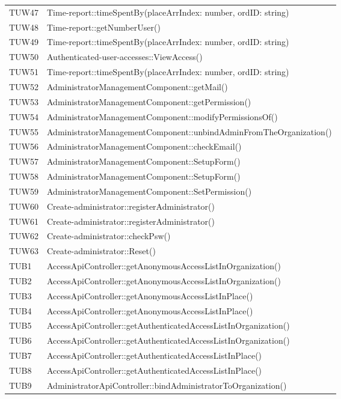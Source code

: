 {\begin{longtable}{C{2cm} C{8cm}}
		TUW47 & Time-report::timeSpentBy(placeArrIndex: number, ordID: string) \\
		TUW48 & Time-report::getNumberUser() \\
		TUW49 & Time-report::timeSpentBy(placeArrIndex: number, ordID: string) \\
		TUW50 & Authenticated-user-accesses::ViewAccess() \\
		TUW51 & Time-report::timeSpentBy(placeArrIndex: number, ordID: string) \\
		TUW52 & AdministratorManagementComponent::getMail() \\
		TUW53 & AdministratorManagementComponent::getPermission() \\
		TUW54 & AdministratorManagementComponent::modifyPermissionsOf() \\
		TUW55 & AdministratorManagementComponent::unbindAdminFromTheOrganization() \\
		TUW56 & AdministratorManagementComponent::checkEmail() \\
		TUW57 & AdministratorManagementComponent::SetupForm() \\
		TUW58 & AdministratorManagementComponent::SetupForm() \\
		TUW59 & AdministratorManagementComponent::SetPermission() \\
		TUW60 & Create-administrator::registerAdministrator() \\
		TUW61 & Create-administrator::registerAdministrator() \\
		TUW62 & Create-administrator::checkPsw() \\
		TUW63 & Create-administrator::Reset() \\
		TUB1 & AccessApiController::getAnonymousAccessListInOrganization()\\
		TUB2 & AccessApiController::getAnonymousAccessListInOrganization()\\
		TUB3 & AccessApiController::getAnonymousAccessListInPlace()\\
		TUB4 & AccessApiController::getAnonymousAccessListInPlace()\\
		TUB5 & AccessApiController::getAuthenticatedAccessListInOrganization()\\
		TUB6 & AccessApiController::getAuthenticatedAccessListInOrganization()\\
		TUB7 & AccessApiController::getAuthenticatedAccessListInPlace()\\
		TUB8 & AccessApiController::getAuthenticatedAccessListInPlace()\\
		TUB9 & AdministratorApiController::bindAdministratorToOrganization()\\

\end{longtable}}
